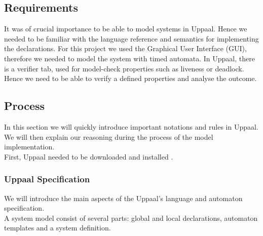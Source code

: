 \documentclass[a4paper, twocolumn]{article}
\begin{document}
\subsection{Requirements}
It was of crucial importance to be able to model systems in Uppaal. Hence we needed to be familiar with the language reference and semantics for implementing the declarations. For this project we used the Graphical User Interface (GUI), therefore we needed to model the system with timed automata. In Uppaal, there is a verifier tab, used for model-check properties such as liveness or deadlock. Hence we need to be able to verify a defined properties and analyse the outcome.

\subsection{Process}
In this section we will quickly introduce important notations and rules in Uppaal. We will then explain our reasoning during the process of the model implementation.\\
First, Uppaal needed to be downloaded and installed \cite{install}.
\subsubsection{Uppaal Specification}
We will introduce the main aspects of the Uppaal's language and automaton specification.\\
A system model consist of several parts: global and local declarations, automaton templates and a system definition.\\
\end{document}
